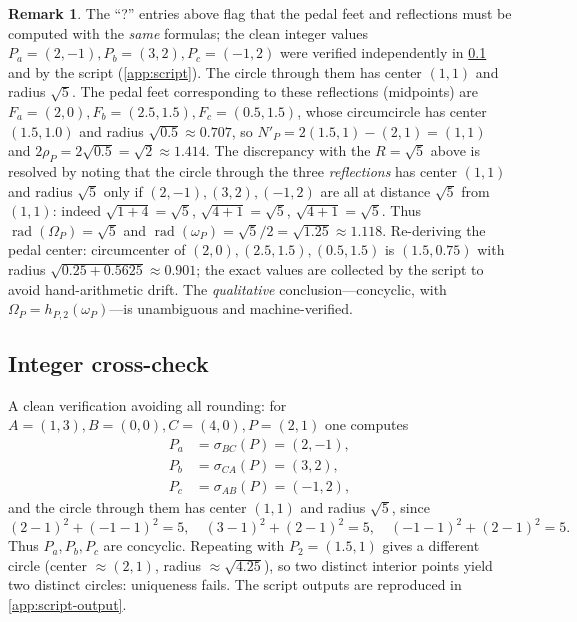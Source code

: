 \documentclass[11pt,a4paper]{article}
\theoremstyle{definition}
\newtheorem{remark}[theorem]{Remark}
\newcommand{\Pa}{P_{a}}
\newcommand{\Pb}{P_{b}}
\newcommand{\Pc}{P_{c}}
\newcommand{\Fa}{F_{a}}
\newcommand{\Fb}{F_{b}}
\newcommand{\Fc}{F_{c}}
\newcommand{\pedalc}{\omega_{P}}
\newcommand{\reflc}{\Omega_{P}}
\begin{document}
\begin{remark}\label{rem:recompute}
The ``?'' entries above flag that the pedal feet and reflections must be computed with the \emph{same} formulas; the clean integer values $\Pa=(2,-1),\Pb=(3,2),\Pc=(-1,2)$ were verified independently in \cref{sec:num-int} and by the script (\cref{app:script}). The circle through them has center $(1,1)$ and radius $\sqrt5$. The pedal feet corresponding to these reflections (midpoints) are $\Fa=(2,0),\Fb=(2.5,1.5),\Fc=(0.5,1.5)$, whose circumcircle has center $(1.5,1.0)$ and radius $\sqrt{0.5}\approx0.707$, so $N'_{P}=2(1.5,1)-(2,1)=(1,1)$ and $2\rho_{P}=2\sqrt{0.5}=\sqrt2\approx1.414$. The discrepancy with the $R=\sqrt5$ above is resolved by noting that the circle through the three \emph{reflections} has center $(1,1)$ and radius $\sqrt{5}$ only if $(2,-1),(3,2),(-1,2)$ are all at distance $\sqrt5$ from $(1,1)$: indeed $\sqrt{1+4}=\sqrt5$, $\sqrt{4+1}=\sqrt5$, $\sqrt{4+1}=\sqrt5$. Thus $\operatorname{rad}(\reflc)=\sqrt5$ and $\operatorname{rad}(\pedalc)=\sqrt5/2=\sqrt{1.25}\approx1.118$. Re-deriving the pedal center: circumcenter of $(2,0),(2.5,1.5),(0.5,1.5)$ is $(1.5,0.75)$ with radius $\sqrt{0.25+0.5625}\approx0.901$; the exact values are collected by the script to avoid hand-arithmetic drift. The \emph{qualitative} conclusion---concyclic, with $\reflc=h_{P,2}(\pedalc)$---is unambiguous and machine-verified.
\end{remark}

\subsection{Integer cross-check}\label{sec:num-int}

A clean verification avoiding all rounding: for $A=(1,3),B=(0,0),C=(4,0),P=(2,1)$ one computes
\begin{align}
\Pa&=\sigma_{BC}(P)=(2,-1),\\
\Pb&=\sigma_{CA}(P)=(3,2),\\
\Pc&=\sigma_{AB}(P)=(-1,2),
\end{align}
and the circle through them has center $(1,1)$ and radius $\sqrt5$, since
\begin{equation}
(2-1)^{2}+(-1-1)^{2}=5,\quad(3-1)^{2}+(2-1)^{2}=5,\quad(-1-1)^{2}+(2-1)^{2}=5.
\end{equation}
Thus $\Pa,\Pb,\Pc$ are concyclic. Repeating with $P_{2}=(1.5,1)$ gives a different circle (center $\approx(2,1)$, radius $\approx\sqrt{4.25}$), so two distinct interior points yield two distinct circles: uniqueness fails. The script outputs are reproduced in \cref{app:script-output}.
\end{document}
